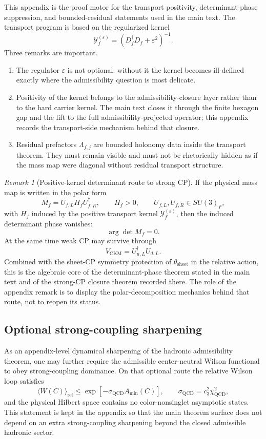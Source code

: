 \documentclass[11pt,a4paper]{article}
\theoremstyle{definition}
\theoremstyle{remark}
\newtheorem*{remark}{Remark}
\newcommand{\cthree}{c_3}
\newcommand{\QCD}{\mathrm{QCD}}
\newcommand{\sigmaQCD}{\sigma_{\mathrm{QCD}}}
\begin{document}
This appendix is the proof motor for the transport positivity, determinant-phase suppression, and
bounded-residual statements used in the main text. The transport program is based on the regularized kernel
\[
\mathcal Y_f^{(\varepsilon)}=(D_f^\dagger D_f+\varepsilon^2)^{-1}.
\]
Three remarks are important.
\begin{enumerate}[leftmargin=1.5em, topsep=3pt, itemsep=3pt]
    \item The regulator $\varepsilon$ is not optional: without it the kernel becomes ill-defined exactly where the admissibility question is most delicate.
    \item Positivity of the kernel belongs to the admissibility-closure layer rather than to the hard carrier kernel. The main text closes it through the finite hexagon gap and the lift to the full admissibility-projected operator; this appendix records the transport-side mechanism behind that closure.
    \item Residual prefactors $\Lambda_{f,j}$ are bounded holonomy data inside the transport theorem. They must remain visible and must not be rhetorically hidden as if the mass map were diagonal without residual transport structure.
\end{enumerate}

\begin{remark}[Positive-kernel determinant route to strong CP]
If the physical mass map is written in the polar form
\[
M_f=U_{f,L}H_fU_{f,R}^\dagger,
\qquad
H_f>0,
\qquad
U_{f,L},U_{f,R}\in SU(3)_F,
\]
with $H_f$ induced by the positive transport kernel $\mathcal Y_f^{(\varepsilon)}$, then the induced determinant phase vanishes:
\[
\arg\det M_f=0.
\]
At the same time weak CP may survive through
\[
V_{\mathrm{CKM}}=U_{u,L}^\dagger U_{d,L}.
\]
Combined with the sheet-CP symmetry protection of $\theta_{\mathrm{sheet}}$ in the relative action,
this is the algebraic core of the determinant-phase theorem stated in the main text and of the
strong-CP closure theorem recorded there. The role of the appendix remark is to display the
polar-decomposition mechanics behind that route, not to reopen its status.
\end{remark}

\subsection{Optional strong-coupling sharpening}

As an appendix-level dynamical sharpening of the hadronic admissibility theorem, one may further require the
admissible center-neutral Wilson functional to obey strong-coupling dominance. On that optional
route the relative Wilson loop satisfies
\[
\langle W(C)\rangle_{\mathrm{rel}}
\le
\exp[-\sigmaQCD A_{\min}(C)],
\qquad
\sigmaQCD=\cthree^2\chi_{\QCD}^2,
\]
and the physical Hilbert space contains no color-nonsinglet asymptotic states. This statement is
kept in the appendix so that the main theorem surface does not depend on an extra strong-coupling
sharpening beyond the closed admissible hadronic sector.
\end{document}
